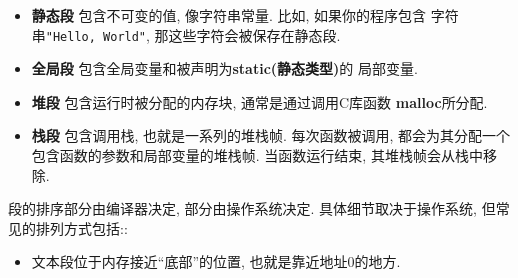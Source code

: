 \documentclass[12pt]{book}
\begin{document}
{\begin{itemize}
\item {\bf 静态段} 包含不可变的值, 像字符串常量. 比如, 如果你的程序包含
字符串{\tt "Hello, World"}, 那这些字符会被保存在静态段.


\item {\bf 全局段} 包含全局变量和被声明为{\bf static(静态类型)}的
局部变量.

\item {\bf 堆段} 包含运行时被分配的内存块, 通常是通过调用C库函数
{\bf malloc}所分配.

\item {\bf 栈段} 包含调用栈, 也就是一系列的堆栈帧.
每次函数被调用, 都会为其分配一个包含函数的参数和局部变量的堆栈帧.
当函数运行结束, 其堆栈帧会从栈中移除. 

\end{itemize}

段的排序部分由编译器决定, 部分由操作系统决定.
具体细节取决于操作系统, 但常见的排列方式包括::

\begin{itemize}
%
%
%
%
\item 文本段位于内存接近``底部''的位置, 也就是靠近地址0的地方.


\end{itemize}}
\end{document}
